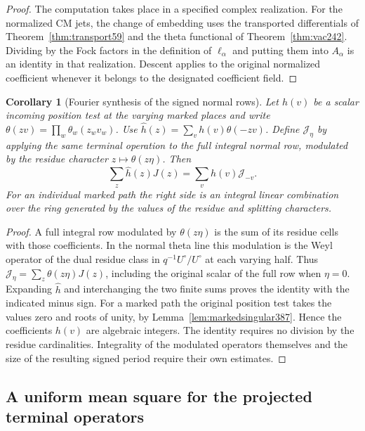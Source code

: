 \documentclass[a4paper,11pt]{article}
\newtheorem{corollary}[proposition]{Corollary}
\theoremstyle{definition}
\theoremstyle{remark}
\numberwithin{equation}{section}
\begin{document}
\begin{proof}
The computation takes place in a specified complex realization.
For the normalized CM jets, the change of embedding uses the
transported differentials of Theorem~\ref{thm:transport59} and
the theta functional of Theorem~\ref{thm:vac242}. Dividing by
the Fock factors in the definition of \(\ell_\alpha\) and putting
them into \(A_\alpha\) is an identity in that realization. Descent
applies to the original normalized coefficient whenever it
belongs to the designated coefficient field.
\end{proof}

\begin{corollary}[Fourier synthesis of the signed normal rows]
\label{cor:normaltranslate388}
Let \(h(v)\) be a scalar incoming position test at the varying
marked places and write \(\theta(zv)=\prod_w\theta_w(z_wv_w)\).
Use \(\widehat h(z)=\sum_v h(v)\theta(-zv)\). Define
\(\mathcal J_\eta\) by applying the same terminal operation to
the full integral normal row, modulated by the residue character
\(z\mapsto\theta(z\eta)\). Then
\[
      \sum_z \widehat h(z)J(z)=\sum_v h(v)\mathcal J_{-v}.
\]
For an individual marked path the right side is an integral
linear combination over the ring generated by the values of
the residue and splitting characters.
\end{corollary}
\begin{proof}
A full integral row modulated by \(\theta(z\eta)\) is the sum of
its residue cells with those coefficients. In the normal theta
line this modulation is the Weyl operator of the dual residue
class in \(q^{-1}U^\circ/U^\circ\) at each varying half. Thus
\(\mathcal J_\eta=\sum_z\theta(z\eta)J(z)\), including the
original scalar of the full row when \(\eta=0\).
Expanding \(\widehat h\) and interchanging the two finite sums
proves the identity with the indicated minus sign. For a marked
path the original position test takes the values zero and roots
of unity, by Lemma~\ref{lem:markedsingular387}. Hence the
coefficients \(h(v)\) are algebraic integers. The identity
requires no division by the residue cardinalities. Integrality
of the modulated operators themselves and the size of the
resulting signed period require their own estimates.
\end{proof}


\subsection{A uniform mean square for the projected terminal operators}
\label{sec:normalbergman389}
\end{document}
